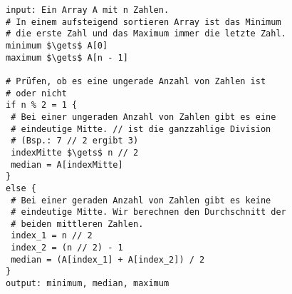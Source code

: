 %
%
\begin{minipage}{\linewidth}
\begin{lstlisting}[language=pseudocode, caption={Algorithmus für das Problem \protect\autoref{problem-min-median-max-n-zahlen}}, label={lst-algo-min-median-max-n-zahlen}]
input: Ein Array A mit n Zahlen.
# In einem aufsteigend sortieren Array ist das Minimum
# die erste Zahl und das Maximum immer die letzte Zahl.
minimum $\gets$ A[0]
maximum $\gets$ A[n - 1]

# Prüfen, ob es eine ungerade Anzahl von Zahlen ist
# oder nicht
if n % 2 = 1 {
 # Bei einer ungeraden Anzahl von Zahlen gibt es eine
 # eindeutige Mitte. // ist die ganzzahlige Division
 # (Bsp.: 7 // 2 ergibt 3)
 indexMitte $\gets$ n // 2
 median = A[indexMitte]
}
else {
 # Bei einer geraden Anzahl von Zahlen gibt es keine
 # eindeutige Mitte. Wir berechnen den Durchschnitt der
 # beiden mittleren Zahlen.
 index_1 = n // 2
 index_2 = (n // 2) - 1
 median = (A[index_1] + A[index_2]) / 2
}
output: minimum, median, maximum
\end{lstlisting}
\end{minipage}
